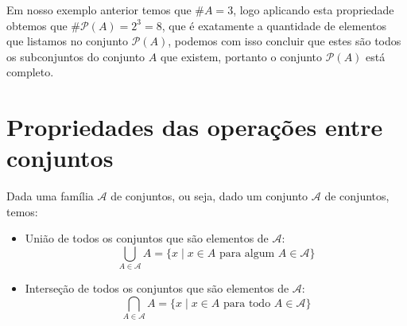  Em nosso exemplo anterior temos que $\# A= 3$, logo aplicando esta propriedade obtemos que $\# \mathcal{P}(A)= 2^3= 8$, que é exatamente a quantidade de elementos que listamos no conjunto $\mathcal{P}(A)$, podemos com isso concluir que estes são todos os subconjuntos do conjunto $A$ que existem, portanto o conjunto $\mathcal{P}(A)$ está completo.



 \newpage
 \section{Propriedades das operações entre conjuntos}

 Dada uma família $\mathcal{A}$ de conjuntos, ou seja, dado um conjunto $\mathcal{A}$ de conjuntos, temos:
 \begin{itemize}
 \item União de todos os conjuntos que são elementos de $\mathcal{A}$:
 $$\bigcup_{A \in \mathcal{A}} A = \{x\mid x \in A \text{ para algum } A \in \mathcal{A}\}$$
 \item Interseção de todos os conjuntos que são elementos de $\mathcal{A}$:
 $$\bigcap_{A \in \mathcal{A}} A = \{x\mid x \in A \text{ para todo } A \in \mathcal{A}\}$$
\end{itemize}

